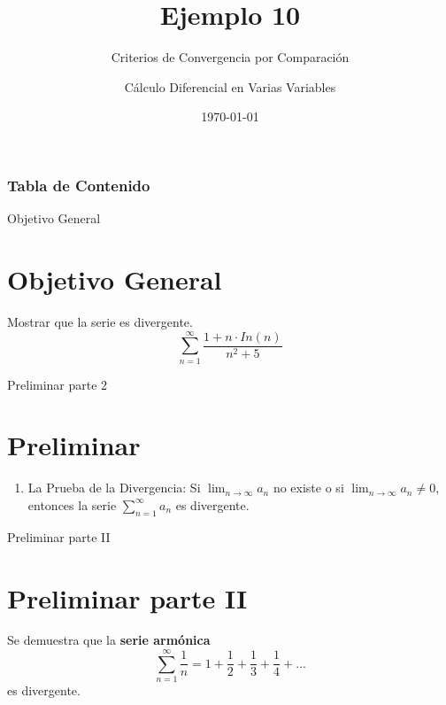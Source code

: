 \documentclass{beamer}
\title[Criterios de Convergencia por Comparación] %
{Ejemplo 10}
\subtitle{Criterios de Convergencia por Comparación}
\author[] %
{Cálculo Diferencial en Varias Variables}
\institute[FCBIyT] %
{
  Estudiante:\\
  Said Tecpa Juárez
}
\date[] %
{\today}
\begin{document}
\frame{\titlepage}


\begin{frame}
\frametitle{Tabla de Contenido}
\tableofcontents
\end{frame}


\begin{frame}{Objetivo General}
    \section{Objetivo General}
    Mostrar que la serie es divergente.
    \begin{equation*}
        \sum_{n=1}^{\infty}\frac{1+n\cdot In(n)}{n^2+5}
    \end{equation*}
\end{frame}



\begin{frame}{Preliminar parte 2}
    \section{Preliminar}
    \begin{enumerate}
        \item La Prueba de la Divergencia: Si $\lim_{n\rightarrow\infty}a_n$ no existe o si $\lim_{n\rightarrow\infty}a_n \neq 0$, entonces la serie $\sum_{n=1}^{\infty}a_n$ es divergente.
    \end{enumerate}
\end{frame}


\begin{frame}{Preliminar parte II}
    \section{Preliminar parte II}
    Se demuestra que la \textbf{serie armónica}
    \begin{equation*}
        \sum_{n=1}^{\infty}\frac{1}{n}=1 + \frac{1}{2} + \frac{1}{3} + \frac{1}{4}+...
    \end{equation*}
    es divergente.
\end{frame}
\end{document}
